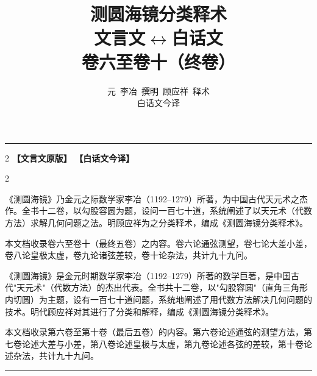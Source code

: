 \documentclass[11pt,a4paper]{article}
\title{
  \textcolor{volumecolor}{\Huge 测圆海镜分类释术}\\[0.5em]
  \textcolor{classicalcolor}{\Large 文言文}\quad$\longleftrightarrow$\quad\textcolor{moderncolor}{\Large 白话文}\\[0.5em]
  \large 卷六至卷十（终卷）
}
\author{
  \textcolor{classicalcolor}{元~李冶~撰}\qquad\textcolor{classicalcolor}{明~顾应祥~释术}\\[0.3em]
  \textcolor{moderncolor}{白话文今译}
}
\date{}
\begin{document}
\maketitle
\thispagestyle{empty}

\vspace{1em}
\begin{center}
\rule{0.6\textwidth}{0.5pt}
\end{center}

\vspace{1em}
\begin{paracol}{2}
\switchcolumn*
\noindent\textbf{\textcolor{classicalcolor}{【文言文原版】}}
\switchcolumn
\noindent\textbf{\textcolor{moderncolor}{【白话文今译】}}
\end{paracol}

\vspace{1em}

\begin{paracol}{2}

\switchcolumn*
\noindent
《测圆海镜》乃金元之际数学家李冶（1192--1279）所著，为中国古代天元术之杰作。全书十二卷，以勾股容圆为题，设问一百七十道，系统阐述了以天元术（代数方法）求解几何问题之法。明顾应祥为之分类释术，编成《测圆海镜分类释术》。

\vspace{0.5em}
\noindent
本文档收录卷六至卷十（最终五卷）之内容。卷六论通弦测望，卷七论大差小差，卷八论皇极太虚，卷九论诸弦差较，卷十论杂法，共计九十九问。

\switchcolumn
\noindent
《测圆海镜》是金元时期数学家李冶（1192--1279）所著的数学巨著，是中国古代"天元术"（代数方法）的杰出代表。全书共十二卷，以"勾股容圆"（直角三角形内切圆）为主题，设有一百七十道问题，系统地阐述了用代数方法解决几何问题的技术。明代顾应祥对其进行了分类和解释，编成《测圆海镜分类释术》。

\vspace{0.5em}
\noindent
本文档收录第六卷至第十卷（最后五卷）的内容。第六卷论述通弦的测望方法，第七卷论述大差与小差，第八卷论述皇极与太虚，第九卷论述各弦的差较，第十卷论述杂法，共计九十九问。

\end{paracol}

\vspace{1em}
\begin{center}
\rule{0.6\textwidth}{0.5pt}
\end{center}

\newpage
\tableofcontents
\newpage



\newpage
\end{document}
